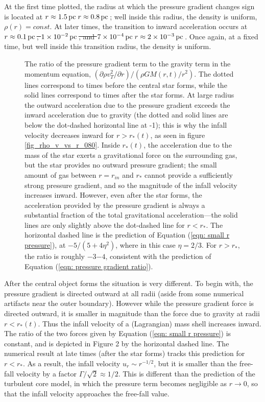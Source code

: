 \documentclass[iop,apj,numberedappendix]{emulateapj}
\newcommand       \phil[1]      {{\color{blue} #1}}
\newcommand       \pc		{\,{\rm pc \,}}
\newcommand       \etaeff       {\eta}
\begin{document}
At the first time plotted, the radius at which the pressure gradient
changes sign is located at \phil{\sout{$r\approx 1.5\pc$}$r\approx 0.8\pc$}; well inside this radius,
the density is uniform, $\rho(r)=const.$ At later times, the
transition to inward acceleration occurs at \phil{\sout{$r\approx 0.1\pc$,
$1\times10^{-2}\pc$, and $7\times10^{-4}\pc$}$r\approx 2\times 10^{-3}\pc$}. Once again, at a fixed
time, but well inside this transition radius, the density is uniform.
%
\begin{figure}
\caption{\label{fig_pressure_gravity_vs_r}The ratio of the pressure
  gradient term to the gravity term in the momentum equation,
  $(\partial \rho v_T^2/\partial r)/(\rho GM(r,t)/r^2)$. The dotted
  lines correspond to times before the central star forms, while the
  solid lines correspond to times after the star forms. At large
  radius the outward acceleration due to the pressure gradient exceeds
  the inward acceleration due to gravity (the dotted and solid lines
  are below the dot-dashed horizontal line at -1); this is why the
  infall velocity decreases inward for $r>r_*(t)$, as seen in figure
  \ref{fig_rho_v_vs_r_080}. Inside $r_*(t)$, the acceleration due to
  the mass of the star exerts a gravitational force on the surrounding
  gas, but the star provides no outward pressure gradient; the small
  amount of gas between $r=r_{in}$ and $r_*$ cannot provide a
  sufficiently strong pressure gradient, and so the magnitude of the
  infall velocity increases inward. However, even after the star
  forms, the acceleration provided by the pressure gradient is always
  a substantial fraction of the total gravitational acceleration---the
  solid lines are only slightly above the dot-dashed line for
  $r<r_*$. The horizontal dashed line is the prediction of
  Equation (\ref{eqn: small r pressure}), at $-5/(5+4\etaeff^2)$, where in
  this case $\etaeff=2/3$. For $r>r_*$, the ratio is roughly \phil{\sout{$-3$}$-4$},
  consistent with the prediction of Equation (\ref{eqn: pressure gradient
    ratio}).}
\end{figure}


After the central object forms the situation is very different. To
begin with, the pressure gradient is directed outward at all radii
(aside from some numerical artifacts near the outer boundary). However
while the pressure gradient force is directed outward, it is smaller
in magnitude than the force due to gravity at radii $r<r_*(t)$. Thus
the infall velocity of a (Lagrangian) mass shell increases inward. The
ratio of the two forces given by Equation (\ref{eqn: small r
  pressure}) is constant, and is depicted in Figure 2 by the
horizontal dashed line. The numerical result at late times (after the
star forms) tracks this prediction for $r<r_*$. As a result, the
infall velocity $u_r\sim r^{-1/2}$, but it is smaller than the
free-fall velocity by a factor $\Gamma/\sqrt{2}\approx 1/2$. This is
different than the prediction of the turbulent core model, in which
the pressure term becomes negligible as $r\to0$, so that the infall
velocity approaches the free-fall value.
\end{document}
